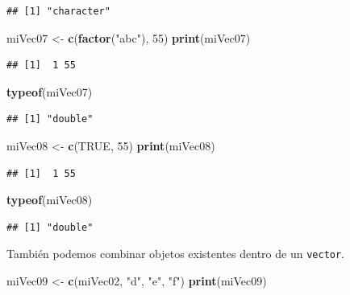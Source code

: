 \documentclass[
]{book}
\newenvironment{Shaded}{\begin{snugshade}}{\end{snugshade}}
\newcommand{\DecValTok}[1]{\textcolor[rgb]{0.00,0.00,0.81}{#1}}
\newcommand{\KeywordTok}[1]{\textcolor[rgb]{0.13,0.29,0.53}{\textbf{#1}}}
\newcommand{\NormalTok}[1]{#1}
\newcommand{\OtherTok}[1]{\textcolor[rgb]{0.56,0.35,0.01}{#1}}
\newcommand{\StringTok}[1]{\textcolor[rgb]{0.31,0.60,0.02}{#1}}
\begin{document}
\begin{verbatim}
## [1] "character"
\end{verbatim}

\begin{Shaded}
\begin{Highlighting}[]
\NormalTok{miVec07 <-}\StringTok{ }\KeywordTok{c}\NormalTok{(}\KeywordTok{factor}\NormalTok{(}\StringTok{"abc"}\NormalTok{), }\DecValTok{55}\NormalTok{)}
\KeywordTok{print}\NormalTok{(miVec07)}
\end{Highlighting}
\end{Shaded}

\begin{verbatim}
## [1]  1 55
\end{verbatim}

\begin{Shaded}
\begin{Highlighting}[]
\KeywordTok{typeof}\NormalTok{(miVec07)}
\end{Highlighting}
\end{Shaded}

\begin{verbatim}
## [1] "double"
\end{verbatim}

\begin{Shaded}
\begin{Highlighting}[]
\NormalTok{miVec08 <-}\StringTok{ }\KeywordTok{c}\NormalTok{(}\OtherTok{TRUE}\NormalTok{, }\DecValTok{55}\NormalTok{)}
\KeywordTok{print}\NormalTok{(miVec08)}
\end{Highlighting}
\end{Shaded}

\begin{verbatim}
## [1]  1 55
\end{verbatim}

\begin{Shaded}
\begin{Highlighting}[]
\KeywordTok{typeof}\NormalTok{(miVec08)}
\end{Highlighting}
\end{Shaded}

\begin{verbatim}
## [1] "double"
\end{verbatim}

También podemos combinar objetos existentes dentro de un \texttt{vector}.

\begin{Shaded}
\begin{Highlighting}[]
\NormalTok{miVec09 <-}\StringTok{ }\KeywordTok{c}\NormalTok{(miVec02, }\StringTok{"d"}\NormalTok{, }\StringTok{"e"}\NormalTok{, }\StringTok{"f"}\NormalTok{)}
\KeywordTok{print}\NormalTok{(miVec09)}
\end{Highlighting}
\end{Shaded}
\end{document}
